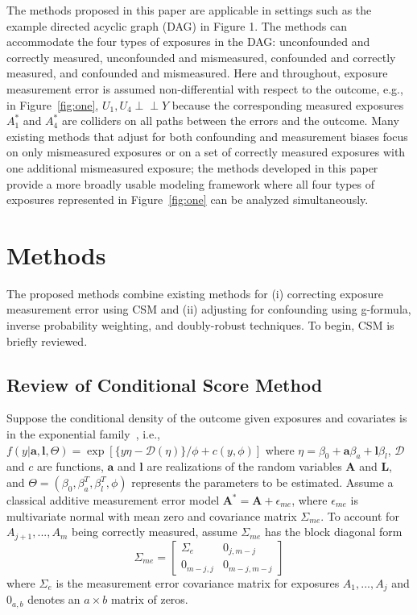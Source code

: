 \documentclass[useAMS,usenatbib,referee]{biom}
\begin{document}
The methods proposed in this paper are applicable in settings such as the example directed acyclic graph (DAG) in Figure 1. The methods can accommodate the four types of exposures in the DAG: unconfounded and correctly measured, unconfounded and mismeasured, confounded and correctly measured, and confounded and mismeasured. Here and throughout, exposure measurement error is assumed non-differential with respect to the outcome, e.g., in Figure~\ref{fig:one}, $U_{1}, U_{4} \perp \!\!\! \perp Y$ because the corresponding measured exposures $A^{*}_{1}$ and $A^{*}_{4}$ are colliders on all paths between the errors and the outcome. Many existing methods that adjust for both confounding and measurement biases focus on only mismeasured exposures or on a set of correctly measured exposures with one additional mismeasured exposure; the methods developed in this paper provide a more broadly usable modeling framework where all four types of exposures represented in Figure~\ref{fig:one} can be analyzed simultaneously.

\section{Methods}
\label{s:methods}

The proposed methods combine existing methods for (i) correcting exposure measurement error using CSM and (ii) adjusting for confounding using g-formula, inverse probability weighting, and doubly-robust techniques. To begin, CSM is briefly reviewed.

\subsection{Review of Conditional Score Method}

Suppose the conditional density of the outcome given exposures and covariates is in the exponential family~\citep{mccullagh1989}, i.e., $f(y | \bm{a}, \bm{l}, \Theta) = \exp [ \{y\eta - \mathcal{D}(\eta)\}/ \phi + c(y, \phi) ]$ where $\eta = \beta_{0} + \bm{a}\beta_{a} + \bm{l}\beta_{l}$, $\mathcal{D}$ and $c$ are functions, $\bm{a}$ and $\bm{l}$ are realizations of the random variables $\bm{A}$ and $\bm{L}$, and $\Theta = (\beta_{0}, \beta^{T}_{a}, \beta^{T}_{l}, \phi)$ represents the parameters to be estimated. Assume a classical additive measurement error model $\bm{A}^{*} = \bm{A} + \epsilon_{me}$, where $\epsilon_{me}$ is multivariate normal with mean zero and covariance matrix $\Sigma_{me}$. To account for $A_{j+1}, ...,  A_{m}$ being correctly measured, assume $\Sigma_{me}$ has the block diagonal form
\begin{equation*}
    \Sigma_{me} =
    \begin{bmatrix}
    \Sigma_{e} & 0_{j,m-j} \\
    0_{m-j,j} & 0_{m-j,m-j}
    \end{bmatrix}
\end{equation*}
where $\Sigma_{e}$ is the measurement error covariance matrix for exposures $A_{1},...,A_{j}$ and $0_{a,b}$ denotes an $a \times b$ matrix of zeros.
\end{document}

